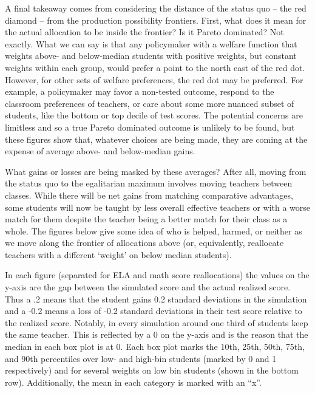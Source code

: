 \documentclass[12pt]{article}
\theoremstyle{definition}
\theoremstyle{definition}
\theoremstyle{definition}
\theoremstyle{definition}
\begin{document}
	A final takeaway comes from considering the distance of the status quo – the red diamond – from the production possibility frontiers. First, what does it mean for the actual allocation to be inside the frontier? Is it Pareto dominated? Not exactly. What we can say is that any policymaker with a welfare function that weights above- and below-median students with positive weights, but constant weights within each group, would prefer a point to the north east of the red dot. However, for other sets of welfare preferences, the red dot may be preferred. For example, a policymaker may favor a non-tested outcome, respond to the classroom preferences of teachers, or care about some more nuanced subset of students, like the bottom or top decile of test scores. The potential concerns are limitless and so a true Pareto dominated outcome is unlikely to be found, but these figures show that, whatever choices are being made, they are coming at the expense of average above- and below-median gains.

    What gains or losses are being masked by these averages? After all, moving from the status quo to the egalitarian maximum involves moving teachers between classes. While there will be net gains from matching comparative advantages, some students will now be taught by less overall effective teachers or with a worse match for them despite the teacher being a better match for their class as a whole. The figures below give some idea of who is helped, harmed, or neither as we move along the frontier of allocations above (or, equivalently, reallocate teachers with a different ‘weight’ on below median students).
	
	In each figure (separated for ELA and math score reallocations) the values on the y-axis are the gap between the simulated score and the actual realized score. Thus a .2 means that the student gains 0.2 standard deviations in the simulation and a -0.2 means a loss of -0.2 standard deviations in their test score relative to the realized score. Notably, in every simulation around one third of students keep the same teacher. This is reflected by a 0 on the y-axis and is the reason that the median in each box plot is at 0. Each box plot marks the 10th, 25th, 50th, 75th, and 90th percentiles over low- and high-bin students (marked by 0 and 1 respectively) and for several weights on low bin students (shown in the bottom row). Additionally, the mean in each category is marked with an “x”.
\end{document}
